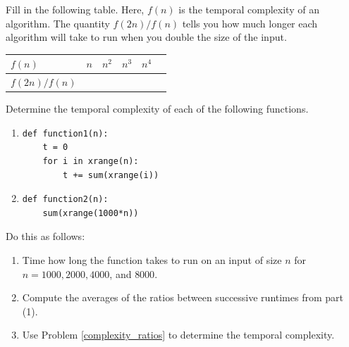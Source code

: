 \begin{problem}\label{complexity_ratios}
Fill in the following table. Here, $f(n)$ is the temporal complexity of an algorithm. The quantity $f(2n)/f(n)$ tells you how much longer each algorithm will take to run when you double the size of the input.

\begin{center}
\begin{tabular}{| l |p{15mm}|p{15mm}|p{15mm}|p{15mm}|p{15mm}|}\hline
$f(n)$ & $n$ & $n^2$ & $n^3$ & $n^4$  \\ \hline
$f(2n)/f(n)$&  & & &  \\
\hline
\end{tabular}
\end{center}

\end{problem}

\begin{problem}\label{complexity_timeit}
Determine the temporal complexity of each of the following functions. 
\begin{enumerate}
\item 
\begin{lstlisting}
def function1(n):
    t = 0
    for i in xrange(n):
        t += sum(xrange(i))
\end{lstlisting}

\item
\begin{lstlisting}
def function2(n):
    sum(xrange(1000*n))
\end{lstlisting}
\end{enumerate}

Do this as follows:
\begin{enumerate}
\item Time how long the function takes to run on an input of size $n$ for $n=1000, 2000, 4000$, and $8000$.
\item Compute the averages of the ratios between successive runtimes from part (1).
\item Use Problem \ref{complexity_ratios} to determine the temporal complexity.
\end{enumerate}
\end{problem}

